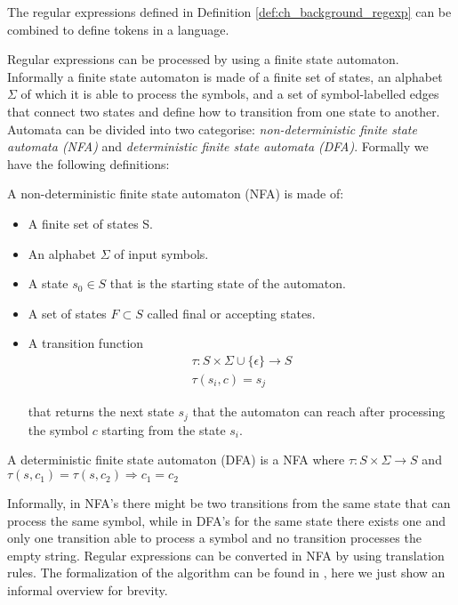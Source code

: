 The regular expressions defined in Definition \ref{def:ch_background_regexp} can be combined to define tokens in a language.

Regular expressions can be processed by using a finite state automaton. Informally a finite state automaton is made of a finite set of states, an alphabet $\Sigma$ of which it is able to process the symbols, and a set of symbol-labelled edges that connect two states and define how to transition from one state to another. Automata can be divided into two categorise: \textit{non-deterministic finite state automata (NFA)} and \textit{deterministic finite state automata (DFA)}. Formally we have the following definitions:

\begin{definition}
	A non-deterministic finite state automaton (NFA) is made of:
	
	\begin{itemize}[noitemsep]
		\item A finite set of states S.
		\item An alphabet $\Sigma$ of input symbols.
		\item A state $s_{0} \in S$ that is the starting state of the automaton.
		\item A set of states $F \subset S$ called final or accepting states.
		\item A transition function
			\begin{equation*}
				\begin{array}{l}
					\tau : S \times \Sigma \cup \lbrace \epsilon \rbrace \rightarrow S\\
					\tau(s_{i},c) = s_{j}
				\end{array}
			\end{equation*}
			
			that returns the next state $s_{j}$ that the automaton can reach after processing the symbol $c$ starting from the state $s_{i}$.
	\end{itemize}
\end{definition}

\begin{definition}
	A deterministic finite state automaton (DFA) is a NFA where $\tau : S \times \Sigma \rightarrow S$ and $\tau(s,c_{1}) = \tau(s,c_{2}) \Rightarrow c_{1} = c_{2}$
\end{definition}

Informally, in NFA's there might be two transitions from the same state that can process the same symbol, while in DFA's for the same state there exists one and only one transition able to process a symbol and no transition processes the empty string. Regular expressions can be converted in NFA by using translation rules. The formalization of the algorithm can be found in \cite{mcnaughton1960regular}, here we just show an informal overview for brevity.

